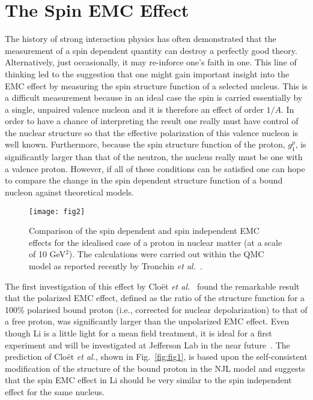 \documentclass{ws-ijmpe}
\begin{document}
\section{The Spin EMC Effect}
The history of strong interaction physics has often demonstrated that the measurement of a spin dependent quantity can destroy a perfectly good theory. Alternatively, just occasionally, it may re-inforce one's faith in one. This line of thinking  led to the suggestion that one might gain important insight into the EMC effect by measuring the spin structure function of a selected nucleus. This is a difficult measurement because in an ideal case the spin is carried essentially by a single, unpaired valence nucleon and it is therefore an effect of order $1/A$. In order to have a chance of interpreting the result one really must have control of the nuclear structure so that the effective polarization of this valence nucleon is well known. Furthermore, because the spin structure function of the proton, $g_1^p$, is significantly larger than that of the neutron, the nucleus really must be one with a valence proton. However, if all of these conditions can be satisfied one can hope to compare the change in the spin dependent structure function of a bound nucleon against theoretical models.
%
\begin{figure}[th]
\centerline{\texttt{[image: fig2]}}
\caption{Comparison of the spin dependent and spin independent EMC effects for the idealised case of a proton in nuclear matter (at a scale of 10 GeV$^2$). The calculations were carried out within the QMC model as reported recently by 
Tronchin {\it et al.}~\cite{Tronchin:2018mvu}.}
\label{fig:tronchin}
\end{figure}
%

The first investigation of this effect by Clo\"et {\it et al.}~\cite{Cloet:2005rt,Cloet:2006bq} found the remarkable result that the polarized EMC effect, defined as the ratio of the structure function for a 100\% polarised bound proton (i.e., corrected for nuclear depolarization) to that of a free proton, was significantly larger than the unpolarized EMC effect. Even though Li is a little light for a mean field treatment, it is ideal for a first experiment and will be investigated at Jefferson Lab in the near future~\cite{bosted}. The prediction of Clo\"et {\it et al.}, shown in Fig.~\ref{fig:fig1}, is based upon the self-consistent modification of the structure of the bound proton in the NJL model and suggests that the spin EMC effect in Li should be very similar to the spin independent effect for the same nucleus.
\end{document}
